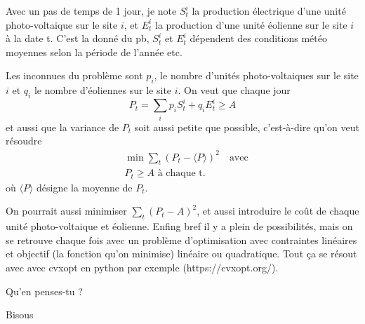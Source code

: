 \documentclass[a4paper, 11pt, leqno]{article}
\begin{document}
Avec un pas de temps de 1 jour, je note $S_t^i$ la production électrique 
d'une unité photo-voltaique sur le site $i$, et $E_t^i$ la production d'une unité éolienne 
sur le site $i$ à la date t. C'est la donné du pb, $S_t^i$ et $E_t^i$ 
dépendent des conditions météo moyennes selon la période de l'année etc. 

Les inconnues du problème sont $p_i$, le nombre d'unités photo-voltaiques sur le site $i$
et $q_i$ le nombre d'éoliennes sur le site $i$. On veut que chaque jour
$$
P_t =\sum_i p_i S_t^i + q_i E_t^i \geq A
$$
et aussi que la variance de $P_t$ soit aussi petite que possible, c'est-à-dire qu'on veut 
résoudre
\begin{align*}
& \min \sum_t \left( P_t - \langle P \rangle \right)^2 \quad \text{avec} \\
& P_t \geq A \text{ à chaque t}.
\end{align*}
où $\langle P \rangle$ désigne la moyenne de $P_t$.

On pourrait aussi minimiser $\sum_t \left ( P_t - A \right )^2$, et aussi introduire le 
coût de chaque unité photo-voltaique et éolienne. Enfing bref il y a plein de possibilités, 
mais on se retrouve chaque fois avec un problème d'optimisation avec contraintes linéaires
et objectif (la fonction qu'on minimise) linéaire ou quadratique. Tout ça se résout avec avec cvxopt en python par exemple (https://cvxopt.org/).

\vspace{0.5cm}
\noindent
Qu'en penses-tu ?

\vspace{0.5cm}
\noindent
Bisous
\end{document}

